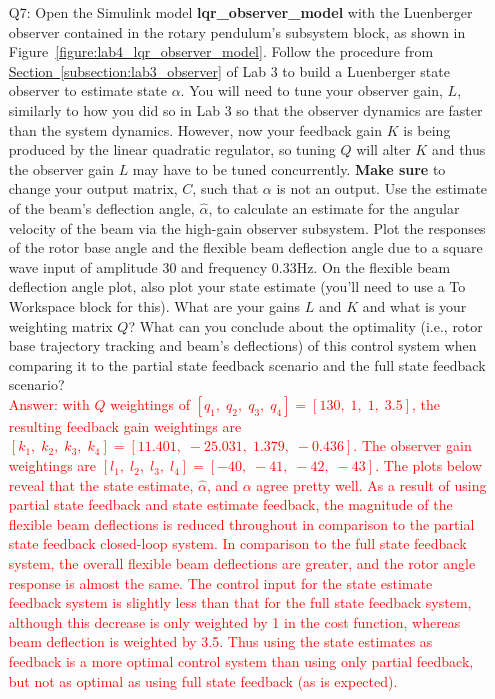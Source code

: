 \documentclass[12pt]{report}
\newcommand\drew[1]{\textcolor{red}{#1}}
\begin{document}
\begin{enumerate}
    \item[Q7:] Open the Simulink model \textbf{lqr\_observer\_model} with the Luenberger observer contained in the rotary pendulum's subsystem block, as shown in Figure~\ref{figure:lab4_lqr_observer_model}. Follow the procedure from \hyperref[subsection:lab3_observer]{Section~\ref{subsection:lab3_observer}} of Lab 3 to build a Luenberger state observer to estimate state $\alpha$. You will need to tune your observer gain, $L$, similarly to how you did so in Lab 3 so that the observer dynamics are faster than the system dynamics. However, now your feedback gain $K$ is being produced by the linear quadratic regulator, so tuning $Q$ will alter $K$ and thus the observer gain $L$ may have to be tuned concurrently. \textbf{Make sure} to change your output matrix, $C$, such that $\alpha$ is not an output. Use the estimate of the beam's deflection angle, $\hat{\alpha}$, to calculate an estimate for the angular velocity of the beam via the high-gain observer subsystem. Plot the responses of the rotor base angle and the flexible beam deflection angle due to a square wave input of amplitude 30 and frequency 0.33Hz. On the flexible beam deflection angle plot, also plot your state estimate (you'll need to use a To Workspace block for this). What are your gains $L$ and $K$ and what is your weighting matrix $Q$? What can you conclude about the optimality (i.e., rotor base trajectory tracking and beam's deflections) of this control system when comparing it to the partial state feedback scenario and the full state feedback scenario?\\
          \drew{Answer: with $Q$ weightings of $[q_1,\; q_2,\; q_3,\; q_4] = [130,\; 1,\; 1,\; 3.5]$, the resulting feedback gain weightings are $[k_1,\; k_2,\; k_3,\; k_4] = [11.401,\; -25.031,\; 1.379,\; -0.436]$. The observer gain weightings are $[l_1,\; l_2,\; l_3,\; l_4] = [-40,\; -41,\; -42,\; -43]$. The plots below reveal that the state estimate, $\hat{\alpha}$, and $\alpha$ agree pretty well. As a result of using partial state feedback and state estimate feedback, the magnitude of the flexible beam deflections is reduced throughout in comparison to the partial state feedback closed-loop system. In comparison to the full state feedback system, the overall flexible beam deflections are greater, and the rotor angle response is almost the same. The control input for the state estimate feedback system is slightly less than that for the full state feedback system, although this decrease is only weighted by 1 in the cost function, whereas beam deflection is weighted by 3.5. Thus using the state estimates as feedback is a more optimal control system than using only partial feedback, but not as optimal as using full state feedback (as is expected).
}
\end{enumerate}
\end{document}
